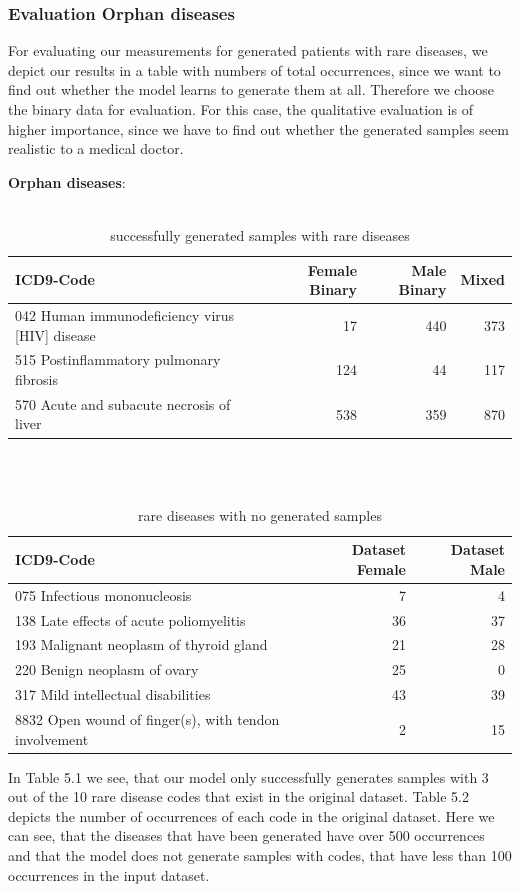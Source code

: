 \documentclass[11pt, a4paper]{book}
\begin{document}
\subsubsection{Evaluation Orphan diseases}
For evaluating our measurements for generated patients with rare diseases, we depict our results in a table with numbers of total occurrences, since we want to find out whether the model learns to generate them at all. 
Therefore we choose the binary data for evaluation.
For this case, the qualitative evaluation is of higher importance, since we have to find out whether the generated samples seem realistic to a medical doctor.


\textbf{Orphan diseases}:
\\
\\
\begin{table}
\begin{tabular}{l|r|r|r}
ICD9-Code & Female Binary & Male Binary & Mixed\\
\hline
042 Human immunodeficiency virus [HIV] disease	& 17 & 440 & 373\\
515 Postinflammatory pulmonary fibrosis & 124 & 44 & 117\\
570 Acute and subacute necrosis of liver & 538	& 359 & 870\\
\end{tabular}
\caption{\label{tab:rare-generataed}successfully generated samples with rare diseases}
\end{table}
\\
\\
\begin{table}
\begin{tabular}{l|r|r}
ICD9-Code & Dataset Female & Dataset Male\\
\hline
075 Infectious mononucleosis & 7 & 4\\
138 Late effects of acute poliomyelitis & 36 & 37 \\
193 Malignant neoplasm of thyroid gland & 21 & 28 \\
220 Benign neoplasm of ovary & 25	& 0\\
317 Mild intellectual disabilities & 43 & 39\\
8832 Open wound of finger(s), with tendon involvement & 2 & 15\\ 
\end{tabular}
\caption{\label{tab:rare-not-generated}rare diseases with no generated samples}
\end{table}

In Table 5.1 we see, that our model only successfully generates samples with 3 out of the 10 rare disease codes that exist in the original dataset.
Table 5.2 depicts the number of occurrences of each code in the original dataset. Here we can see, that the diseases that have been generated have over 500 occurrences and that the model  does not generate samples with codes, that have less than 100 occurrences in the input dataset.
\end{document}
